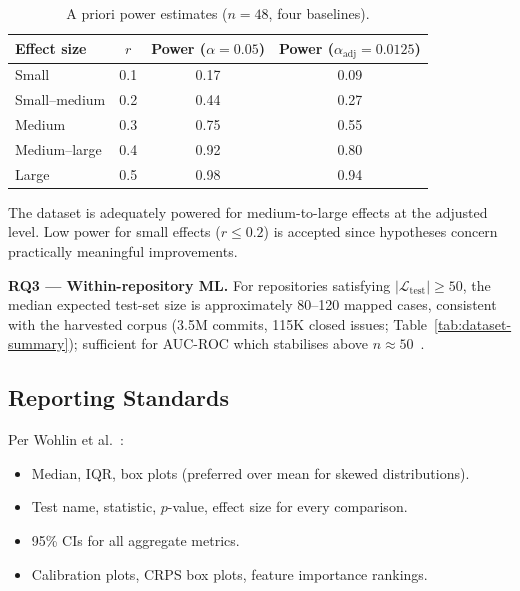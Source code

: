 \begin{table}[htbp]
\centering
\caption{A priori power estimates ($n = 48$, four baselines).}
\label{tab:power-analysis}
\small
\begin{tabular}{lccc}
\toprule
\textbf{Effect size} & \textbf{$r$} &
  \textbf{Power ($\alpha = 0.05$)} &
  \textbf{Power ($\alpha_{\text{adj}} = 0.0125$)} \\
\midrule
Small         & 0.1 & 0.17 & 0.09 \\
Small--medium & 0.2 & 0.44 & 0.27 \\
Medium        & 0.3 & 0.75 & 0.55 \\
Medium--large & 0.4 & 0.92 & 0.80 \\
Large         & 0.5 & 0.98 & 0.94 \\
\bottomrule
\end{tabular}
\end{table}

The dataset is adequately powered for medium-to-large effects at the
adjusted level. Low power for small effects ($r \leq 0.2$) is accepted
since hypotheses concern practically meaningful improvements.

\textbf{RQ3 — Within-repository ML.} For repositories satisfying
$|\mathcal{L}_{\text{test}}| \geq 50$, the median expected test-set size
is approximately 80--120 mapped cases, consistent with the harvested
corpus (3.5M commits, 115K closed issues;
Table~\ref{tab:dataset-summary}); sufficient for AUC-ROC which
stabilises above $n \approx 50$~\cite{hanley1982meaning}.


\subsection{Reporting Standards}
\label{sec:reporting}

Per Wohlin et al.~\cite{wohlin2012experimentation}:
\begin{itemize}
    \item Median, IQR, box plots (preferred over mean for skewed
    distributions).
    \item Test name, statistic, $p$-value, effect size for every
    comparison.
    \item 95\% CIs for all aggregate metrics.
    \item Calibration plots, CRPS box plots, feature importance rankings.
\end{itemize}


